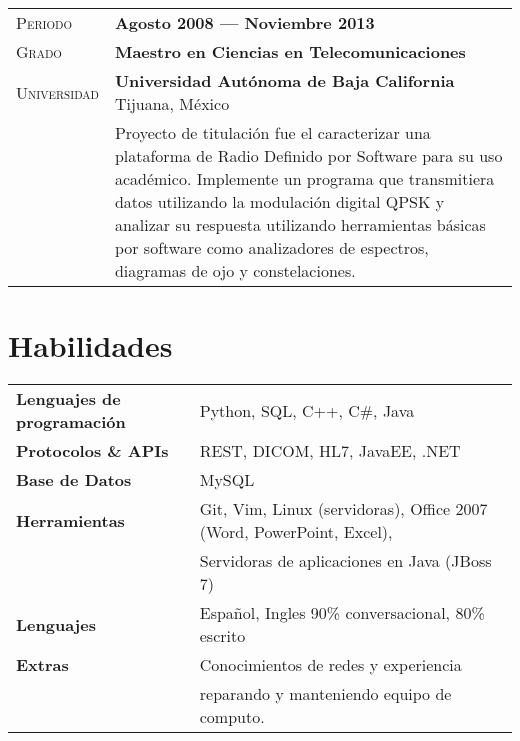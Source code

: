 \documentclass[a4paper, oneside, final]{scrartcl} %
\newcommand{\gray}{\rowcolor[gray]{.90}} %
\begin{document}
\begin{center}
\vspace{12pt}

\begin{tabularx}{0.97\linewidth}{>{\raggedleft\scshape}p{2cm}X}
\gray Periodo & \textbf{Agosto 2008 --- Noviembre 2013}\\
\gray Grado & \textbf{Maestro en Ciencias en Telecomunicaciones}\\
\gray Universidad & \textbf{Universidad Autónoma de Baja California} \hfill Tijuana, México\\
& Proyecto de titulación fue el caracterizar una plataforma de Radio Definido por Software para su uso académico. Implemente un programa que transmitiera datos utilizando la modulación digital QPSK y analizar su respuesta utilizando herramientas básicas por software como analizadores de espectros, diagramas de ojo y constelaciones.
\end{tabularx}


\section{Habilidades}

\begin{tabular}{ @{} >{\bfseries}l @{\hspace{6ex}} l }
Lenguajes de programación & Python, SQL, C++, C\#, Java \\
Protocolos \& APIs & REST, DICOM, HL7, JavaEE, .NET \\
Base de Datos & MySQL \\
Herramientas & Git, Vim, Linux (servidoras), Office 2007 (Word, PowerPoint, Excel),\\
& Servidoras de aplicaciones en Java (JBoss 7) \\
Lenguajes & Español, Ingles 90\% conversacional, 80\% escrito\\
Extras & Conocimientos de redes y experiencia\\
& reparando y manteniendo equipo de computo.
\end{tabular}



\end{center}
\end{document}
